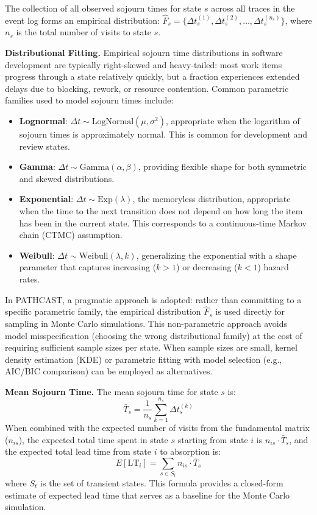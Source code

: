 The collection of all observed sojourn times for state $s$ across all
traces in the event log forms an empirical distribution:
$\hat{F}_s = \{\Delta t_s^{(1)}, \Delta t_s^{(2)}, \ldots, \Delta
t_s^{(n_s)}\}$, where $n_s$ is the total number of visits to state $s$.

\textbf{Distributional Fitting.} Empirical sojourn time distributions in
software development are typically right-skewed and heavy-tailed: most
work items progress through a state relatively quickly, but a fraction
experiences extended delays due to blocking, rework, or resource
contention. Common parametric families used to model sojourn times
include:

\begin{itemize}
    \item \textbf{Lognormal}: $\Delta t \sim \text{LogNormal}(\mu,
    \sigma^2)$, appropriate when the logarithm of sojourn times is
    approximately normal. This is common for development and review states.
    \item \textbf{Gamma}: $\Delta t \sim \text{Gamma}(\alpha, \beta)$,
    providing flexible shape for both symmetric and skewed distributions.
    \item \textbf{Exponential}: $\Delta t \sim \text{Exp}(\lambda)$, the
    memoryless distribution, appropriate when the time to the next
    transition does not depend on how long the item has been in the
    current state. This corresponds to a continuous-time Markov chain
    (CTMC) assumption.
    \item \textbf{Weibull}: $\Delta t \sim \text{Weibull}(\lambda, k)$,
    generalizing the exponential with a shape parameter that captures
    increasing ($k > 1$) or decreasing ($k < 1$) hazard rates.
\end{itemize}

In PATHCAST, a pragmatic approach is adopted: rather than committing
to a specific parametric family, the empirical distribution $\hat{F}_s$
is used directly for sampling in Monte Carlo simulations. This
non-parametric approach avoids model misspecification (choosing the wrong
distributional family) at the cost of requiring sufficient sample sizes
per state. When sample sizes are small, kernel density estimation (KDE)
or parametric fitting with model selection (e.g., AIC/BIC comparison)
can be employed as alternatives.

\textbf{Mean Sojourn Time.} The mean sojourn time for state $s$ is:
\begin{equation}
\label{eq:mean-sojourn}
\bar{T}_s = \frac{1}{n_s} \sum_{k=1}^{n_s} \Delta t_s^{(k)}
\end{equation}
When combined with the expected number of visits from the fundamental
matrix ($n_{is}$), the expected total time spent in state $s$ starting
from state $i$ is $n_{is} \cdot \bar{T}_s$, and the expected total
lead time from state $i$ to absorption is:
\begin{equation}
\label{eq:expected-lead-time}
E[\text{LT}_i] = \sum_{s \in S_t} n_{is} \cdot \bar{T}_s
\end{equation}
where $S_t$ is the set of transient states. This formula provides a
closed-form estimate of expected lead time that serves as a baseline
for the Monte Carlo simulation.



